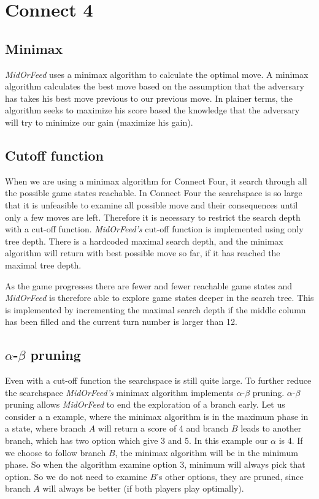 \section{Connect 4}

\subsection{Minimax}
\textit{MidOrFeed} uses a minimax algorithm to calculate the optimal move. A minimax algorithm calculates the best move based on the assumption that the adversary has takes his best move previous to our previous move. In plainer terms, the algorithm seeks to maximize his score based the knowledge that the adversary will try to minimize our gain (maximize his gain).

\subsection{Cutoff function}
When we are using a minimax algorithm for Connect Four, it search through all the possible game states reachable. In Connect Four the searchspace is so large that it is unfeasible to examine all possible move and their consequences until only a few moves are left. Therefore it is necessary to restrict the search depth with a cut-off function. \textit{MidOrFeed's} cut-off function is implemented using only tree depth. There is a hardcoded maximal search depth, and the minimax algorithm will return with best possible move so far, if it has reached the maximal tree depth. 

As the game progresses there are fewer and fewer reachable game states and \textit{MidOrFeed} is therefore able to explore game states deeper in the search tree. This is implemented by incrementing the maximal search depth if the middle column has been filled and the current turn number is larger than 12. 

\subsection{$\alpha$-$\beta$ pruning}
Even with a cut-off function the searchspace is still quite large. To further reduce the searchspace \textit{MidOrFeed's} minimax algorithm implements $\alpha$-$\beta$ pruning. $\alpha$-$\beta$ pruning allows \textit{MidOrFeed} to end the exploration of a branch early. Let us consider a n example, where the minimax algorithm is in the maximum phase in a state, where branch $A$ will return a score of 4 and branch $B$ leads to another branch, which has two option which give 3 and 5. In this example our $\alpha$ is 4. If we choose to follow branch $B$, the minimax algorithm will be in the minimum phase. So when the algorithm examine option 3, minimum will always pick that option. So we do not need to examine $B$'s other options, they are pruned, since branch $A$ will always be better (if both players play optimally).

